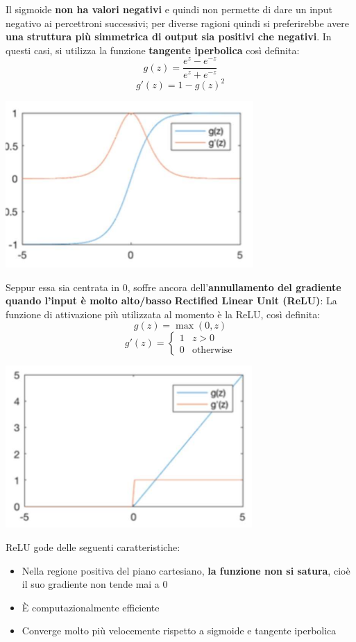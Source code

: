 \documentclass[12pt]{article}
\begin{document}
Il sigmoide \textbf{non ha valori negativi} e quindi non permette di dare un input negativo ai percettroni successivi; per diverse ragioni quindi si preferirebbe avere \textbf{una struttura più simmetrica di output sia positivi che negativi}.
In questi casi, si utilizza la funzione \textbf{tangente iperbolica} così definita:
$$g(z) = \frac{e^z - e^{-z}}{e^z + e^{-z}}$$
$$g'(z) = 1 - g(z)^2$$
\begin{center}
    \includegraphics[width = 0.40\linewidth]{Images/132.PNG}
\end{center}
Seppur essa sia centrata in 0, soffre ancora dell'\textbf{annullamento del gradiente quando l'input è molto alto/basso} \newline
\textbf{Rectified Linear Unit (ReLU)}: \newline
La funzione di attivazione più utilizzata al momento è la ReLU, così definita:
$$g(z) = \max(0, z)$$
\begin{equation*}
    g'(z) = \begin{cases}
        1 & z > 0 \\
        0 & \textrm{otherwise}
    \end{cases}
\end{equation*}
\begin{center}
    \includegraphics[width =0.40\linewidth]{Images/133.PNG}
\end{center}
ReLU gode delle seguenti caratteristiche:
\begin{itemize}
    \item Nella regione positiva del piano cartesiano, \textbf{la funzione non si satura}, cioè il suo gradiente non tende mai a 0
    \item È computazionalmente efficiente
    \item Converge molto più velocemente rispetto a sigmoide e tangente iperbolica
\end{itemize}
\end{document}
